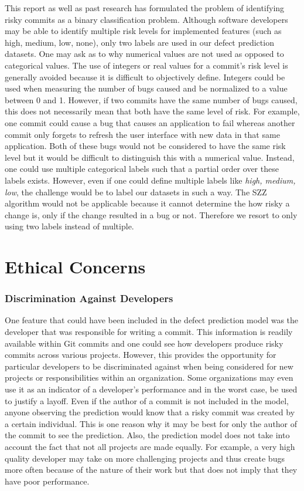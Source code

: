 \documentclass[../main.tex]{subfiles}
\begin{document}
This report as well as past research has formulated the problem of identifying risky commits as a binary classification problem. Although software developers may be able to identify multiple risk levels for implemented features (such as high, medium, low, none), only two labels are used in our defect prediction datasets. One may ask as to why numerical values are not used as opposed to categorical values. The use of integers or real values for a commit's risk level is generally avoided because it is difficult to objectively define. Integers could be used when measuring the number of bugs caused and be normalized to a value between 0 and 1. However, if two commits have the same number of bugs caused, this does not necessarily mean that both have the same level of risk. For example, one commit could cause a bug that causes an application to fail whereas another commit only forgets to refresh the user interface with new data in that same application. Both of these bugs would not be considered to have the same risk level but it would be difficult to distinguish this with a numerical value. Instead, one could use multiple categorical labels such that a partial order over these labels exists. However, even if one could define multiple labels like \textit{high, medium, low}, the challenge would be  to label our datasets in such a way. The SZZ algorithm would not be applicable because it cannot determine the how risky a change is, only if the change resulted in a bug or not. Therefore we resort to only using two labels instead of multiple. 

\section{Ethical Concerns}

\subsubsection{Discrimination Against Developers}

One feature that could have been included in the defect prediction model was the developer that was responsible for writing a commit. This information is readily available within Git commits and one could see how developers produce risky commits across various projects. However, this provides the opportunity for particular developers to be discriminated against when being considered for new projects or responsibilities within an organization. Some organizations may even use it as an indicator of a developer's performance and in the worst case, be used to justify a layoff. Even if the author of a commit is not included in the model, anyone observing the prediction would know that a risky commit was created by a certain individual. This is one reason why it may be best for only the author of the commit to see the prediction. Also, the prediction model does not take into account the fact that not all projects are made equally. For example, a very high quality developer may take on more challenging projects and thus create bugs more often because of the nature of their work but that does not imply that they have poor performance. 
\end{document}
